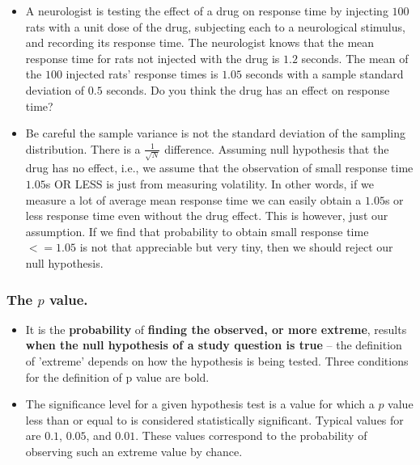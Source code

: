 \documentclass[11pt]{article}
\providecommand{\tightlist}{%
      \setlength{\itemsep}{0pt}\setlength{\parskip}{0pt}}
\begin{document}
\begin{itemize}
\tightlist
\item
  A neurologist is testing the effect of a drug on response time by
  injecting \(100\) rats with a unit dose of the drug, subjecting each
  to a neurological stimulus, and recording its response time. The
  neurologist knows that the mean response time for rats not injected
  with the drug is \(1.2\) seconds. The mean of the \(100\) injected
  rats' response times is \(1.05\) seconds with a sample standard
  deviation of \(0.5\) seconds. Do you think the drug has an effect on
  response time?\\
\item
  Be careful the sample variance is not the standard deviation of the
  sampling distribution. There is a \(\frac{1}{\sqrt{N}}\) difference.
  Assuming null hypothesis that the drug has no effect, i.e., we assume
  that the observation of small response time \(1.05\)s OR LESS is just
  from measuring volatility. In other words, if we measure a lot of
  average mean response time we can easily obtain a \(1.05\)s or less
  response time even without the drug effect. This is however, just our
  assumption. If we find that probability to obtain small response time
  \(<= 1.05\) is not that appreciable but very tiny, then we should
  reject our null hypothesis.
\end{itemize}

    \subsubsection{\texorpdfstring{The \(p\)
value.}{The p value.}}\label{the-p-value.}

\begin{itemize}
\tightlist
\item
  It is the \textbf{probability} of \textbf{finding the observed, or
  more extreme}, results \textbf{when the null hypothesis of a study
  question is true} -- the definition of 'extreme' depends on how the
  hypothesis is being tested. Three conditions for the definition of p
  value are bold.\\
\item
  The significance level for a given hypothesis test is a value for
  which a \(p\) value less than or equal to is considered statistically
  significant. Typical values for are \(0.1\), \(0.05\), and \(0.01\).
  These values correspond to the probability of observing such an
  extreme value by chance.
\end{itemize}
\end{document}
